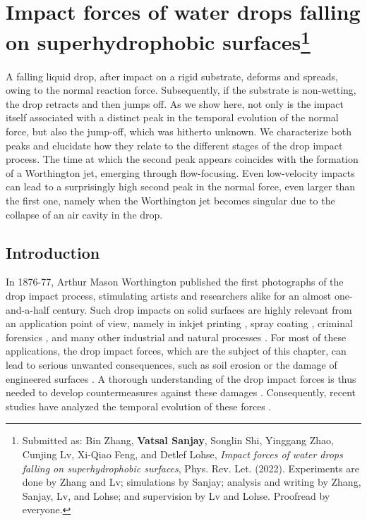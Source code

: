 \chapter[Impact forces of water drops falling on superhydrophobic surfaces]{Impact forces of water drops falling on superhydrophobic surfaces\footnote{Submitted as: Bin Zhang, \textbf{Vatsal Sanjay}, Songlin Shi, Yinggang Zhao, Cunjing Lv, Xi-Qiao Feng, and Detlef Lohse, \textit{Impact forces of water drops falling on superhydrophobic surfaces}, Phys. Rev. Let. (2022). Experiments are done by Zhang and Lv; simulations by Sanjay; analysis and writing by Zhang, Sanjay, Lv, and Lohse; and supervision by Lv and Lohse. Proofread by everyone.}}
\label{chap:DropForces}


A falling liquid drop, after impact on a rigid substrate,  deforms and spreads, owing to the normal reaction force. Subsequently, if the substrate is non-wetting, the drop retracts and then jumps off. As we show here, not only is the impact itself associated with a distinct peak in the temporal evolution of the normal force, but also the jump-off, which was hitherto unknown. We characterize both peaks and elucidate how they relate to the different stages of the drop impact process. The time at which the second peak appears coincides with the formation of a Worthington jet, emerging through flow-focusing.  Even low-velocity impacts can lead to a surprisingly high second peak in the normal force, even larger than the first one, namely when the Worthington jet becomes singular due to the collapse of an air cavity in the drop. 

\clearpage

\section{Introduction}

In 1876-77, Arthur Mason Worthington \cite{worthington1877xxviii, worthington1877second} published the first photographs of the drop impact process, stimulating artists and researchers alike for an almost one-and-a-half century. Such drop impacts  on solid surfaces are highly relevant from an application point of view, namely in inkjet printing \cite{lohse2022fundamental}, spray coating \cite{kim2007spray}, criminal forensics \cite{smith2018influence}, and many other industrial and natural processes \cite{josserand2016drop, yarin2006drop, yarin2017}. For most of these applications, the drop impact forces, which are the subject of this chapter, can lead to serious unwanted consequences, such as soil erosion \cite{nearing1986} or the damage of engineered surfaces \cite{ahmad2013, amirzadeh2017, gohardani2011}. A thorough understanding of the drop impact forces is thus needed to develop countermeasures against these damages \cite{cheng2021drop}. Consequently, recent studies have analyzed the temporal evolution of these forces \cite{li2014, soto2014, philippi2016, zhang2017, Gordillo2018, mitchell2019, zhang2019}. 

